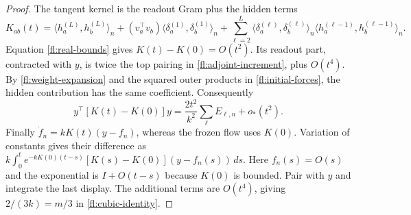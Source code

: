 \begin{proof}
The tangent kernel is the readout Gram plus the hidden terms
\[
 K_{ab}(t)=\langle h_a^{(L)},h_b^{(L)}\rangle_n
 +(v_a^\top v_b)\langle\delta_a^{(1)},\delta_b^{(1)}\rangle_n
 +\sum_{\ell=2}^L\langle\delta_a^{(\ell)},\delta_b^{(\ell)}\rangle_n
                 \langle h_a^{(\ell-1)},h_b^{(\ell-1)}\rangle_n.
\]
Equation \eqref{fl:real-bounds} gives $K(t)-K(0)=O(t^2)$.
Its readout part, contracted with $y$, is twice the top pairing in
\eqref{fl:adjoint-increment}, plus $O(t^4)$.
By \eqref{fl:weight-expansion} and the squared outer products in
\eqref{fl:initial-forces}, the hidden contribution has the same coefficient.
Consequently
\[
 y^\top[K(t)-K(0)]y
       =\frac{2t^2}{k^2}\sum_\ell E_{\ell,n}+o_*(t^2).
\]
Finally $\dot f_n=kK(t)(y-f_n)$, whereas the frozen flow uses $K(0)$.
Variation of constants gives their difference as
$k\int_0^t e^{-kK(0)(t-s)}[K(s)-K(0)](y-f_n(s))\,ds$.
Here $f_n(s)=O(s)$ and the exponential is $I+O(t-s)$ because $K(0)$
is bounded. Pair with $y$ and integrate the last display. The additional
terms are $O(t^4)$, giving $2/(3k)=m/3$ in \eqref{fl:cubic-identity}.
\end{proof}

